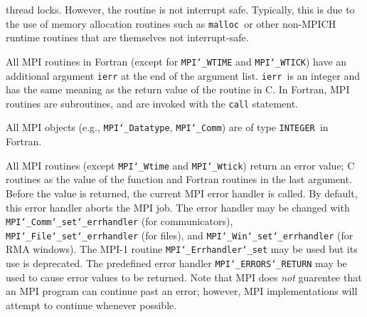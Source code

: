 thread locks.  However, the routine is not interrupt safe.  Typically,
this is due to the use of memory allocation routines such as {\tt malloc
}or other non-MPICH runtime routines that are themselves not interrupt-safe.
\par
{}
All MPI routines in Fortran (except for {\tt MPI{\tt \char`\_}WTIME} and {\tt MPI{\tt \char`\_}WTICK}) have
an additional argument {\tt ierr} at the end of the argument list.  {\tt ierr
}is an integer and has the same meaning as the return value of the routine
in C.  In Fortran, MPI routines are subroutines, and are invoked with the
{\tt call} statement.
\par
All MPI objects (e.g., {\tt MPI{\tt \char`\_}Datatype}, {\tt MPI{\tt \char`\_}Comm}) are of type {\tt INTEGER
}in Fortran.
\par
{}
\par
All MPI routines (except {\tt MPI{\tt \char`\_}Wtime} and {\tt MPI{\tt \char`\_}Wtick}) return an error value;
C routines as the value of the function and Fortran routines in the last
argument.  Before the value is returned, the current MPI error handler is
called.  By default, this error handler aborts the MPI job.  The error handler
may be changed with {\tt MPI{\tt \char`\_}Comm{\tt \char`\_}set{\tt \char`\_}errhandler} (for communicators),
{\tt MPI{\tt \char`\_}File{\tt \char`\_}set{\tt \char`\_}errhandler} (for files), and {\tt MPI{\tt \char`\_}Win{\tt \char`\_}set{\tt \char`\_}errhandler} (for
RMA windows).  The MPI-1 routine {\tt MPI{\tt \char`\_}Errhandler{\tt \char`\_}set} may be used but
its use is deprecated.  The predefined error handler
{\tt MPI{\tt \char`\_}ERRORS{\tt \char`\_}RETURN} may be used to cause error values to be returned.
Note that MPI does {\em not} guarentee that an MPI program can continue past
an error; however, MPI implementations will attempt to continue whenever
possible.
\par
{}
\endmanpage
